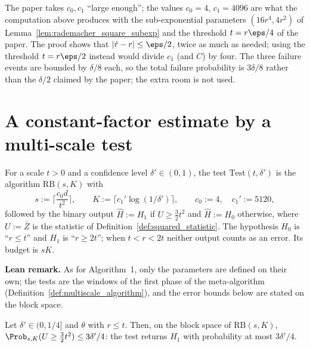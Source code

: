 \begin{remark}\label{rem:norm_additive_constants}
The paper takes $c_0, c_1$ ``large enough''; the values $c_0 = 4$, $c_1 = 4096$ are what the
computation above produces with the sub-exponential parameters $(16r^4, 4r^2)$ of
Lemma~\ref{lem:rademacher_square_subexp} and the threshold $t = r\eps/4$ of the paper. The
proof shows that $|\hat r - r| \le \eps/2$, twice as much as needed; using the threshold
$t = r\eps/2$ instead would divide $c_1$ (and $C$) by four. The three failure events are
bounded by $\delta/8$ each, so the total failure probability is $3\delta/8$ rather than the
$\delta/2$ claimed by the paper; the extra room is not used.
\end{remark}

\section{A constant-factor estimate by a multi-scale test}
\label{sec:norm_test}

\begin{definition}\label{def:scale_test}
\leanok
{}
For a scale $t > 0$ and a confidence level $\delta' \in (0,1)$, the test
$\mathrm{Test}(t,\delta')$ is the algorithm $\mathrm{RB}(s,K)$ with
\[
  s := \Big\lceil \frac{c_0 d}{t^2} \Big\rceil, \qquad
  K := \big\lceil c_1' \log(1/\delta') \big\rceil, \qquad
  c_0 := 4, \quad c_1' := 5120 ,
\]
followed by the binary output $\hat H := H_1$ if $U \ge \tfrac32 t^2$ and $\hat H := H_0$
otherwise, where $U := \bar Z$ is the statistic of Definition~\ref{def:squared_statistic}.
The hypothesis $H_0$ is ``$r \le t$'' and $H_1$ is ``$r \ge 2t$''; when $t < r < 2t$ neither
output counts as an error. Its budget is $sK$.
\end{definition}

\textbf{Lean remark.} As for Algorithm~1, only the parameters are defined on their own; the
tests are the windows of the first phase of the meta-algorithm
(Definition~\ref{def:multiscale_algorithm}), and the error bounds below are stated on the
block space.

\begin{lemma}\label{lem:test_error_h0}
\leanok
{}
Let $\delta' \in (0,1/4]$ and $\theta$ with $r \le t$. Then, on the block space of
$\mathrm{RB}(s,K)$, $\Prob_{s,K}(U \ge \tfrac32 t^2) \le 3\delta'/4$: the test returns $H_1$
with probability at most $3\delta'/4$.
\end{lemma}

